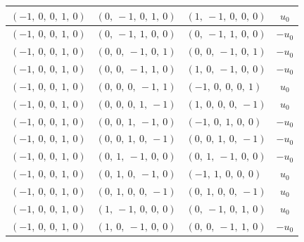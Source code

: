 \documentclass[11pt]{article}
\theoremstyle{definition}
\begin{document}
\begin{longtable}{|l|l|l|c|}
    \hline
    $\left( -1, \  0, \  0, \  1, \  0\right)$ & $\left( 0, \  -1, \  0, \  1, \  0\right)$ & $\left( 1, \  -1, \  0, \  0, \  0\right)$ & $u_{0}$ \\
    \hline
    $\left( -1, \  0, \  0, \  1, \  0\right)$ & $\left( 0, \  -1, \  1, \  0, \  0\right)$ & $\left( 0, \  -1, \  1, \  0, \  0\right)$ & $- u_{0}$ \\
    \hline
    $\left( -1, \  0, \  0, \  1, \  0\right)$ & $\left( 0, \  0, \  -1, \  0, \  1\right)$ & $\left( 0, \  0, \  -1, \  0, \  1\right)$ & $- u_{0}$ \\
    \hline
    $\left( -1, \  0, \  0, \  1, \  0\right)$ & $\left( 0, \  0, \  -1, \  1, \  0\right)$ & $\left( 1, \  0, \  -1, \  0, \  0\right)$ & $- u_{0}$ \\
    \hline
    $\left( -1, \  0, \  0, \  1, \  0\right)$ & $\left( 0, \  0, \  0, \  -1, \  1\right)$ & $\left( -1, \  0, \  0, \  0, \  1\right)$ & $u_{0}$ \\
    \hline
    $\left( -1, \  0, \  0, \  1, \  0\right)$ & $\left( 0, \  0, \  0, \  1, \  -1\right)$ & $\left( 1, \  0, \  0, \  0, \  -1\right)$ & $u_{0}$ \\
    \hline
    $\left( -1, \  0, \  0, \  1, \  0\right)$ & $\left( 0, \  0, \  1, \  -1, \  0\right)$ & $\left( -1, \  0, \  1, \  0, \  0\right)$ & $- u_{0}$ \\
    \hline
    $\left( -1, \  0, \  0, \  1, \  0\right)$ & $\left( 0, \  0, \  1, \  0, \  -1\right)$ & $\left( 0, \  0, \  1, \  0, \  -1\right)$ & $- u_{0}$ \\
    \hline
    $\left( -1, \  0, \  0, \  1, \  0\right)$ & $\left( 0, \  1, \  -1, \  0, \  0\right)$ & $\left( 0, \  1, \  -1, \  0, \  0\right)$ & $- u_{0}$ \\
    \hline
    $\left( -1, \  0, \  0, \  1, \  0\right)$ & $\left( 0, \  1, \  0, \  -1, \  0\right)$ & $\left( -1, \  1, \  0, \  0, \  0\right)$ & $u_{0}$ \\
    \hline
    $\left( -1, \  0, \  0, \  1, \  0\right)$ & $\left( 0, \  1, \  0, \  0, \  -1\right)$ & $\left( 0, \  1, \  0, \  0, \  -1\right)$ & $u_{0}$ \\
    \hline
    $\left( -1, \  0, \  0, \  1, \  0\right)$ & $\left( 1, \  -1, \  0, \  0, \  0\right)$ & $\left( 0, \  -1, \  0, \  1, \  0\right)$ & $u_{0}$ \\
    \hline
    $\left( -1, \  0, \  0, \  1, \  0\right)$ & $\left( 1, \  0, \  -1, \  0, \  0\right)$ & $\left( 0, \  0, \  -1, \  1, \  0\right)$ & $- u_{0}$ \\

\end{longtable}
\end{document}
